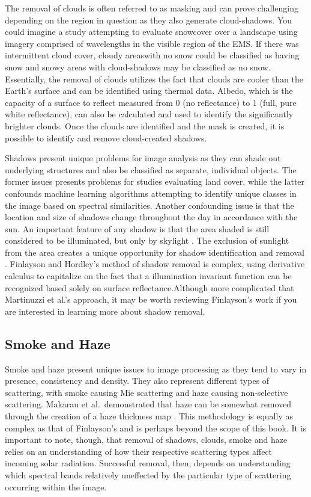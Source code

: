 \documentclass[
]{book}
\begin{document}
The removal of clouds is often referred to as masking and can prove challenging depending on the region in question as they also generate cloud-shadows. You could imagine a study attempting to evaluate snowcover over a landscape using imagery comprised of wavelengths in the visible region of the EMS. If there was intermittent cloud cover, cloudy areaswith no snow could be classified as having snow and snowy areas with cloud-shadows may be classified as no snow. Essentially, the removal of clouds utilizes the fact that clouds are cooler than the Earth's surface and can be identified using thermal data. Albedo, which is the capacity of a surface to reflect measured from 0 (no reflectance) to 1 (full, pure white reflectance), can also be calculated and used to identify the significantly brighter clouds. Once the clouds are identified and the mask is created, it is possible to identify and remove cloud-created shadows.

Shadows present unique problems for image analysis as they can shade out underlying structures and also be classified as separate, individual objects. The former issues presents problems for studies evaluating land cover, while the latter confounds machine learning algorithms attempting to identify unique classes in the image based on spectral similarities. Another confounding issue is that the location and size of shadows change throughout the day in accordance with the sun.
An important feature of any shadow is that the area shaded is still considered to be illuminated, but only by skylight . The exclusion of sunlight from the area creates a unique opportunity for shadow identification and removal \citep{finlayson_color_2001}. Finlayson and Hordley's method of shadow removal is complex, using derivative calculus to capitalize on the fact that a illumination invariant function can be recognized based solely on surface reflectance.Although more complicated that Martinuzzi et al.'s approach, it may be worth reviewing Finlayson's work if you are interested in learning more about shadow removal.

\subsection{Smoke and Haze}\label{smoke-and-haze}

Smoke and haze present unique issues to image processing as they tend to vary in presence, consistency and density. They also represent different types of scattering, with smoke causing Mie scattering and haze causing non-selective scattering. Makarau et al.~demonstrated that haze can be somewhat removed through the creation of a haze thickness map \citep{makarau_haze_2014}. This methodology is equally as complex as that of Finlayson's and is perhaps beyond the scope of this book. It is important to note, though, that removal of shadows, clouds, smoke and haze relies on an understanding of how their respective scattering types affect incoming solar radiation. Successful removal, then, depends on understanding which spectral bands relatively uneffected by the particular type of scattering occurring within the image.
\end{document}
